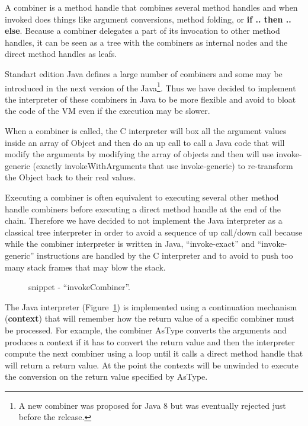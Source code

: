 \documentclass{sig-alternate}
\begin{document}
      A combiner is a method handle that combines several method handles and when invoked
      does things like argument conversions, method folding, or {\bf if .. then .. else}.
      Because a combiner delegates a part of its invocation to other method handles,
      it can be seen as a tree with the combiners as internal nodes and the direct
      method handles as leafs.

      Standart edition Java defines a large number of combiners and some may be introduced in the next version
      of the Java\footnote{A new combiner was proposed for Java 8 but was eventually rejected just before the release.}.
      Thus we have decided to implement the interpreter of these combiners in Java
      to be more flexible and avoid to bloat the code of the VM even if the execution may be slower.
      
      When a combiner is called, the C interpreter will box all the argument values inside an array of Object
      and then do an up call to call a Java code that will modify the arguments by modifying the array
      of objects and then will use invoke-generic (exactly invokeWithArguments that use invoke-generic)
      to re-transform the Object back to their real values.  

      Executing a combiner is often equivalent to executing several other method handle
      combiners before executing a direct method handle at the end of the chain.
      Therefore we have decided to not implement the Java interpreter as a classical
      tree interpreter in order to avoid a sequence of up call/down call because while
      the combiner interpreter is written in Java, ``invoke-exact'' and ``invoke-generic'' instructions
      are handled by the C interpreter and to avoid to push too many stack frames that may blow the stack.
      
      \begin{figure}[!ht]
        \centering \vspace{-1em}
        \caption{snippet - ``invokeCombiner''.}
        \label{implINTERP}
      \end{figure}

      The Java interpreter (Figure~\ref{implINTERP}) is implemented using a continuation mechanism
      ({\bf context}) that will remember how the return value of a specific combiner must be processed.
      For example, the combiner AsType converts the arguments and produces a context if it has
      to convert the return value and then the interpreter compute the next combiner using a loop until it calls
      a direct method handle that will return a return value. At the point the contexts will be unwinded
      to execute the conversion on the return value specified by AsType. 
\end{document}
